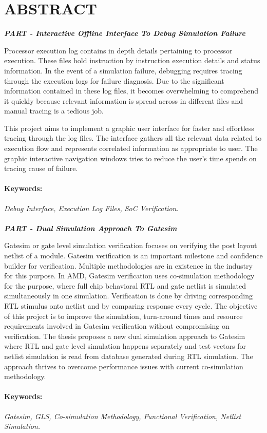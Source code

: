 \section*{\centering ABSTRACT}
\newcommand{\RNum}[1]{\uppercase\expandafter{\romannumeral #1\relax}}


\centerline{\emph{\bf PART \RNum{1}- Interactive Offline Interface To Debug Simulation Failure }}
\vspace{5pt}
Processor execution log contains in depth details pertaining to processor execution.  These files hold instruction by instruction execution details and status information.  In the event of a simulation failure, debugging requires tracing through the execution logs for failure diagnosis.  Due to the significant information contained in these log files, it becomes overwhelming to comprehend it quickly because relevant information is spread across in different files and manual tracing is a tedious job.


This project aims to implement a graphic user interface for faster and effortless tracing through the log files.  The interface gathers all the relevant data related to execution flow and represents correlated information as appropriate to user.  The graphic interactive navigation windows tries to reduce the user's time spends on tracing cause of failure.   



\paragraph{Keywords:}
 \emph{Debug Interface, Execution Log Files, SoC  Verification.}


 \paragraph{}

\centerline{\emph{\bf PART \RNum{2}- Dual Simulation Approach To Gatesim}}
\vspace{5pt}
Gatesim or gate level simulation verification focuses on verifying the post layout netlist of a module. Gatesim verification is an important milestone and confidence builder for verification. Multiple methodologies are in existence in the industry for this purpose. In AMD, Gatesim verification uses co-simulation methodology for the purpose, where full chip behavioral RTL and gate netlist is simulated simultaneously in one simulation. Verification is done by driving corresponding RTL stimulus onto netlist and by comparing response every cycle. 
The objective of this project is to improve the simulation, turn-around times and resource requirements involved in Gatesim verification without compromising on verification. The thesis proposes a new dual simulation approach to Gatesim where RTL and gate level simulation happens separately and test vectors for netlist simulation is read from database generated during RTL simulation. The approach thrives to overcome performance issues with current co-simulation methodology.

\paragraph{Keywords:}
 \emph{Gatesim,  GLS,  Co-simulation Methodology,  Functional Verification, Netlist Simulation.}


